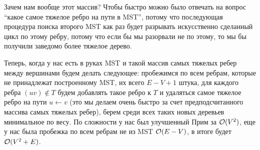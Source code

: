\begin{solution}
\begin{upd}
        Зачем нам вообще этот массив? Чтобы быстро можно было отвечать на вопрос ``какое самое тяжелое ребро на пути в MST'', потому что последующая процедура поиска второго MST как раз будет разрывать искусственно сделанный цикл по этому ребру, потому что если бы мы разорвали не по этому, то мы бы получили заведомо более тяжелое дерево.
    \end{upd}

    Теперь, когда у нас есть в руках MST и такой массив самых тяжелых ребер между вершинами будем делать следующее: пробежимся по всем ребрам, которые не принадлежат построенному MST, их всего $E - V + 1$ штука, для каждого ребра $(uv) \notin T$ будем добавлять такое ребро к $T$ и удаляться самое тяжелое ребро на пути $u \leftarrow v$ (это мы делаем очень быстро за счет предподсчитанного массива самых тяжелых ребер), берем среди всех таких новых деревьев минимальное по весу. По сложности у нас был улучшенный Прим за $\mathcal{O}(V^2)$, еще у нас была пробежка по всем ребрам не из MST $\mathcal{O}(E - V)$, в итоге будет $\mathcal{O}(V^2 + E)$.

\end{solution}